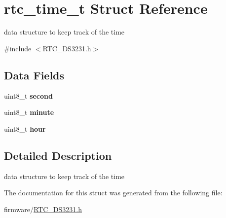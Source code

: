 \hypertarget{structrtc__time__t}{}\section{rtc\+\_\+time\+\_\+t Struct Reference}
\label{structrtc__time__t}


data structure to keep track of the time  




{\ttfamily \#include $<$R\+T\+C\+\_\+\+D\+S3231.\+h$>$}

\subsection*{Data Fields}
\begin{DoxyCompactItemize}
\item 
\hypertarget{structrtc__time__t_a0f4f657d72c7a4b92a8722f1402a0e8c}{}\label{structrtc__time__t_a0f4f657d72c7a4b92a8722f1402a0e8c} 
uint8\+\_\+t {\bfseries second}
\item 
\hypertarget{structrtc__time__t_afbad8a5ee15b17b5dfea1bbf380ce858}{}\label{structrtc__time__t_afbad8a5ee15b17b5dfea1bbf380ce858} 
uint8\+\_\+t {\bfseries minute}
\item 
\hypertarget{structrtc__time__t_a1d50c8c929fc39c9c7d5addec7927a6f}{}\label{structrtc__time__t_a1d50c8c929fc39c9c7d5addec7927a6f} 
uint8\+\_\+t {\bfseries hour}
\end{DoxyCompactItemize}


\subsection{Detailed Description}
data structure to keep track of the time 

The documentation for this struct was generated from the following file\+:\begin{DoxyCompactItemize}
\item 
firmware/\hyperlink{_r_t_c___d_s3231_8h}{R\+T\+C\+\_\+\+D\+S3231.\+h}\end{DoxyCompactItemize}

